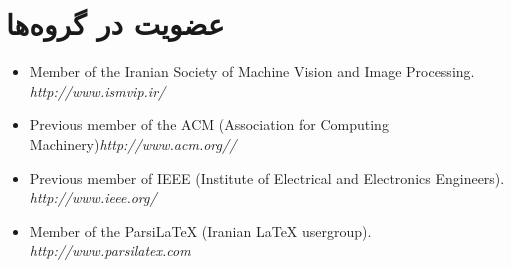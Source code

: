 \documentclass[11pt,a4paper]{bidimoderncv}
\begin{document}
\section{عضویت در گروه‌ها}
\begin{latin}
\small
\begin{itemize}%
\item Member of the Iranian Society of Machine Vision and Image Processing.	\hfill {\scriptsize\em http://www.ismvip.ir/}
\item Previous member of the ACM (Association for Computing Machinery)\hfill {\scriptsize\em http://www.acm.org//}
\item Previous member of IEEE (Institute of Electrical and Electronics Engineers). \hfill {\scriptsize\em http://www.ieee.org/}
\item Member of the ParsiLaTeX (Iranian \LaTeX{} usergroup). \hfill {\scriptsize\em http://www.parsilatex.com}
\end{itemize}	
\end{latin}
\end{document}
